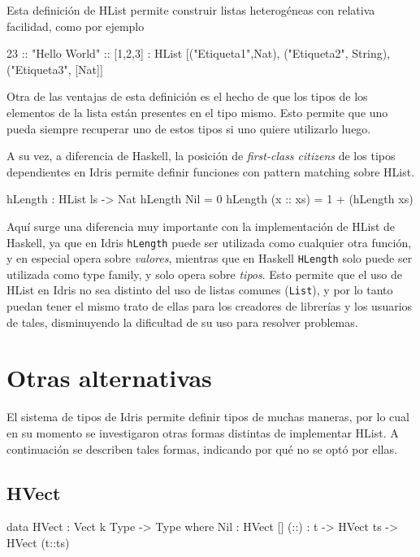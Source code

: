 Esta definición de HList permite construir listas heterogéneas con relativa facilidad, como por ejemplo 

\begin{code}
23 :: "Hello World" :: [1,2,3] :
    HList [("Etiqueta1",Nat), ("Etiqueta2", String), ("Etiqueta3", [Nat]]
\end{code}

Otra de las ventajas de esta definición es el hecho de que los tipos de los elementos de la lista están presentes en el tipo mismo. Esto permite que uno pueda siempre recuperar uno de estos tipos si uno quiere utilizarlo luego.

A su vez, a diferencia de Haskell, la posición de \textit{first-class citizens} de los tipos dependientes en Idris permite definir funciones con pattern matching sobre HList.

\begin{code}
hLength : HList ls -> Nat
hLength Nil = 0
hLength (x :: xs) = 1 + (hLength xs)
\end{code}

Aquí surge una diferencia muy importante con la implementación de HList de Haskell, ya que en Idris \texttt{hLength} puede ser utilizada como cualquier otra función, y en especial opera sobre \textit{valores}, mientras que en Haskell \texttt{HLength} solo puede ser utilizada como type family, y solo opera sobre \textit{tipos}.
Esto permite que el uso de HList en Idris no sea distinto del uso de listas comunes (\texttt{List}), y por lo tanto puedan tener el mismo trato de ellas para los creadores de librerías y los usuarios de tales, disminuyendo la dificultad de su uso para resolver problemas.

\section{Otras alternativas}

El sistema de tipos de Idris permite definir tipos de muchas maneras, por lo cual en su momento se investigaron otras formas distintas de implementar HList.
A continuación se describen tales formas, indicando por qué no se optó por ellas.


\subsection{HVect}

\begin{code}
data HVect : Vect k Type -> Type where
  Nil : HVect []
  (::) : t -> HVect ts -> HVect (t::ts)
\end{code}

